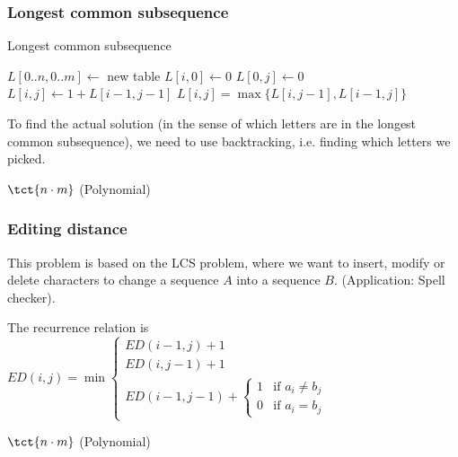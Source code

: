 \newpage
\subsubsection{Longest common subsequence}
\begin{algorithm}
    \begin{spacing}{1.2}
        \caption{Longest common subsequence}
        \begin{algorithmic}[1]
            \State $L[0..n, 0..m] \gets$ new table
                $L[i, 0] \gets 0$
            \EndFor
                $L[0, j] \gets 0$
            \EndFor
                        $L[i, j] \gets 1 + L[i - 1, j - 1]$
                    \Else
                        \hspace{2mm} $L[i, j] = \max\{L[i, j - 1], L[i - 1, j]\}$
                    \EndIf
                \EndFor
            \EndFor
        \end{algorithmic}
    \end{spacing}
\end{algorithm}

To find the actual solution (in the sense of which letters are in the longest common subsequence), we need to use backtracking, i.e. finding which letters we picked.

\timecomplexity $\tct{n \cdot m}$ (Polynomial)


\subsubsection{Editing distance}
This problem is based on the LCS problem, where we want to insert, modify or delete characters to change a sequence $A$ into a sequence $B$. (Application: Spell checker). 

The recurrence relation is $ED(i, j) = \min \begin{cases}
    ED(i - 1, j) + 1\\
    ED(i, j - 1) + 1\\
    ED(i - 1, j - 1) + \begin{cases}
        1 & \text{if } a_i \neq b_j\\
        0 & \text{if } a_i = b_j
    \end{cases}
\end{cases}$

\timecomplexity $\tct{n \cdot m}$ (Polynomial)

